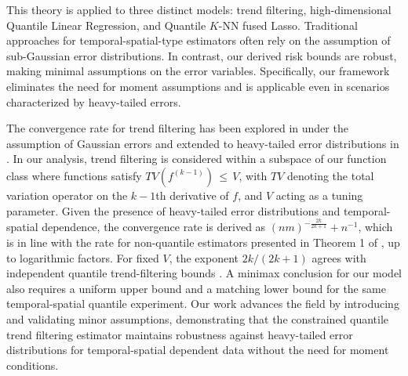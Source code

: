 \documentclass[twoside,11pt]{article}
\newcommand{\rev}[1]{{\color{revisionred}#1}}
\begin{document}
This theory is applied to three distinct models: trend filtering, high-dimensional Quantile Linear Regression, and Quantile \(K\)-NN fused Lasso. Traditional approaches for temporal-spatial-type estimators often rely on the assumption of sub-Gaussian error distributions. In contrast, our derived risk bounds are robust, making minimal assumptions on the error variables. Specifically, our framework eliminates the need for moment assumptions and is applicable even in scenarios characterized by heavy-tailed errors.


The convergence rate for trend filtering has been explored in \cite{guntuboyina2020adaptive, tibshirani2014adaptive, wang2015trend, padilla2023temporal} under the assumption of Gaussian errors and extended to heavy-tailed error distributions in \cite{madrid2022risk,zhang2023risk}. In our analysis, trend filtering is considered within a subspace of our function class where functions satisfy \(TV(f^{(k-1)}) \,\leq\, V\), with \(TV\) denoting the total variation operator on the \(k-1\)th derivative of \(f\), and \(V\) acting as a tuning parameter. Given the presence of heavy-tailed error distributions and temporal-spatial dependence, the convergence rate is derived as \((nm)^{-\frac{2k}{2k+1}} + n^{-1}\), which is in line with the rate for non-quantile estimators presented in Theorem 1 of \cite{padilla2023temporal}, up to logarithmic factors. \rev{For fixed \(V\), the exponent \(2k/(2k+1)\) agrees with independent quantile trend-filtering bounds \cite{madrid2022risk}. A minimax conclusion for our model also requires a uniform upper bound and a matching lower bound for the same temporal-spatial quantile experiment.} Our work advances the field by introducing and validating minor assumptions, demonstrating that the constrained quantile trend filtering estimator maintains robustness against heavy-tailed error distributions for temporal-spatial dependent data without the need for moment conditions.
\end{document}
